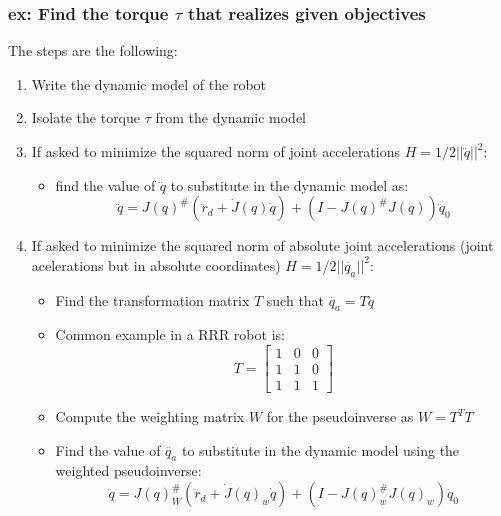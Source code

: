 \documentclass[a4paper,12pt]{article}
\begin{document}
\subsubsection{ex: Find the torque $\tau$ that realizes given objectives}
The steps are the following:
\begin{enumerate}
    \item Write the dynamic model of the robot
    \item Isolate the torque $\tau$ from the dynamic model
    \item If asked to minimize the squared norm of 
    joint accelerations $H=1/2||\ddot{q}||^2$:
    \begin{itemize}
    \item find the value of $\ddot{q}$ to substitute 
    in the dynamic model as: \begin{equation}
    \ddot{q} = J(q)^{\#}(\ddot{r}_d + \dot{J}(q)\dot{q})+ (I-J(q)^{\#}J(q))\ddot{q}_0
    \end{equation}
    \end{itemize}
    \item If asked to minimize the squared norm of 
    absolute joint accelerations (joint acelerations but in absolute 
    coordinates) $H=1/2||\ddot{q_a}||^2$:
    \begin{itemize}
        \item Find the transformation matrix $T$ such that 
        $\ddot{q_a}=T\ddot{q}$
        \item Common example in a RRR robot is: \begin{equation}
        T = \begin{bmatrix}
            1 & 0 & 0 \\
            1 & 1 & 0 \\
            1 & 1 & 1
        \end{bmatrix}
        \end{equation}
        \item Compute the weighting matrix $W$ for the pseudoinverse 
        as $W=T^TT$
        \item Find the value of $\ddot{q_a}$ to substitute 
        in the dynamic model using the weighted pseudoinverse:
        \begin{equation}
            \ddot{q} = J(q)_W^{\#}(\ddot{r}_d + \dot{J}(q)_w\dot{q})+ (I-J(q)^{\#}_wJ(q)_w)\ddot{q}_0
            \end{equation}
            

\end{itemize}
\end{enumerate}
\end{document}
